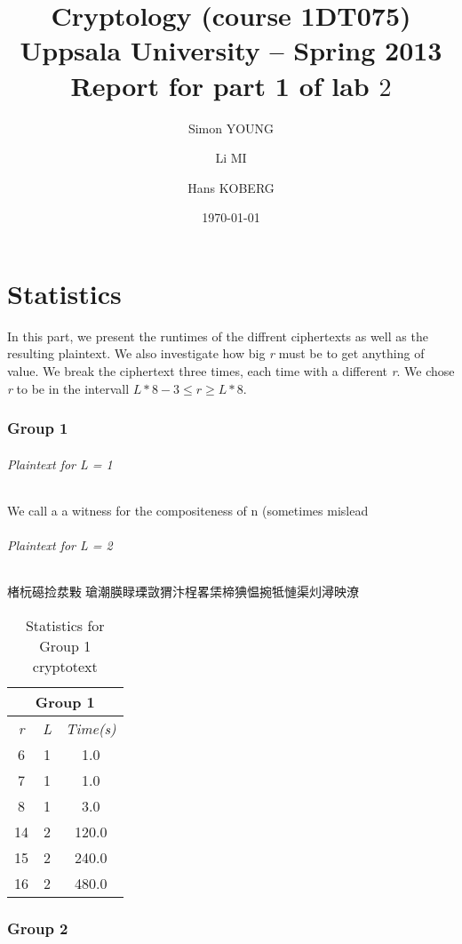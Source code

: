 \documentclass[[UTF8, a4paper, 11pt]{article}
\title{\textbf{Cryptology (course 1DT075) \\ 
    Uppsala University -- Spring 2013 \\
    Report for part 1 of lab $2$
  }
}
\author{Simon YOUNG \and Li MI \and Hans KOBERG} %
\date{\today}
\begin{document}
\maketitle


\part{Statistics}
In this part, we present the runtimes of the diffrent ciphertexts as well as the resulting plaintext. We also investigate how big \emph{r} must be to get anything of value. We break the ciphertext three times, each time with a different \emph{r}. We chose \emph{r} to be in the intervall \begin{math} L*8 - 3 \leq r \geq L*8 \end{math}.

\section{Group 1}

\paragraph{Plaintext for L = 1} We call a a witness for the compositeness of n (sometimes mislead


\paragraph{Plaintext for L = 2} 楮杬礠捡汬敤⁡⁳瑲潮朠睩瑮敳猬⁡汴桯畧栠楴⁩猠愠捥牴慩渠灲潯映潦 

\begin{table}
  \centering
  \begin{tabular}{ |c|c|c| }
    \hline
    \multicolumn{3}{|c|}{Group 1} \\
    \hline
    \emph{r} & \emph{L} & \emph{Time(s)} \\
    \hline
    6 & 1 & 1.0 \\
    7 & 1 & 1.0 \\
    8 & 1 & 3.0 \\
    14 & 2 & 120.0 \\
    15 & 2 & 240.0 \\
    16 & 2 & 480.0 \\
    \hline
  \end{tabular}
  \caption{Statistics for Group 1 cryptotext}
\end{table}

\section{Group 2}
\end{document}
